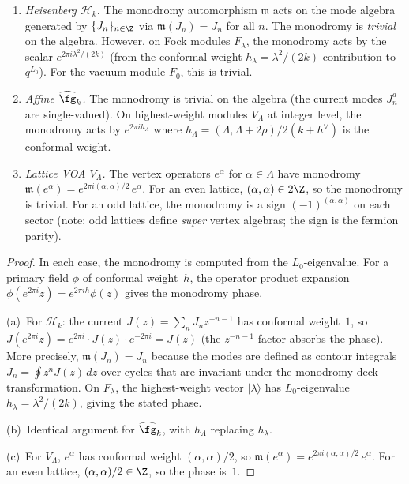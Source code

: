 \begin{proposition}
\label{prop:monodromy-standard}
\begin{enumerate}[label=\textup{(\alph*)}]
\item \emph{Heisenberg $\mathcal{H}_k$.} The monodromy
 automorphism $\mathfrak{m}$ acts on the mode algebra generated
 by $\{J_n\}_{n \in \Z}$ via $\mathfrak{m}(J_n) = J_n$ for all
 $n$. The monodromy is \emph{trivial} on the algebra. However,
 on Fock modules $F_\lambda$, the monodromy acts by the scalar
 $e^{2\pi i \lambda^2 / (2k)}$
 \textup{(}from the conformal weight $h_\lambda = \lambda^2/(2k)$
 contribution to $q^{L_0}$\textup{)}. For the vacuum module
 $F_0$, this is trivial.
\item \emph{Affine $\widehat{\fg}_k$.} The monodromy is trivial on
 the algebra \textup{(}the current modes $J^a_n$ are
 single-valued\textup{)}. On highest-weight modules $V_\Lambda$ at
 integer level, the monodromy acts by
 $e^{2\pi i h_\Lambda}$ where $h_\Lambda = (\Lambda, \Lambda +
 2\rho) / 2(k + h^\vee)$ is the conformal weight.
\item \emph{Lattice VOA $V_\Lambda$.} The vertex operators
 $e^\alpha$ for $\alpha \in \Lambda$ have monodromy
 $\mathfrak{m}(e^\alpha) = e^{2\pi i (\alpha, \alpha)/2}\, e^\alpha$.
 For an even lattice, $(\alpha, \alpha) \in 2\Z$, so the monodromy
 is trivial. For an odd lattice, the monodromy is a sign
 $(-1)^{(\alpha,\alpha)}$ on each sector (note: odd lattices
 define \emph{super} vertex algebras; the sign is the
 fermion parity).
\end{enumerate}
\end{proposition}

\begin{proof}
In each case, the monodromy is computed from the $L_0$-eigenvalue.
For a primary field $\phi$ of conformal weight~$h$, the operator
product expansion $\phi(e^{2\pi i} z) = e^{2\pi i h} \phi(z)$ gives
the monodromy phase.

(a)~For $\mathcal{H}_k$: the current $J(z) = \sum_n J_n z^{-n-1}$
has conformal weight~$1$, so $J(e^{2\pi i}z) = e^{2\pi i} \cdot
J(z) \cdot e^{-2\pi i} = J(z)$ (the $z^{-n-1}$ factor absorbs the
phase). More precisely, $\mathfrak{m}(J_n) = J_n$ because the modes
are defined as contour integrals $J_n = \oint z^n J(z)\,dz$ over
cycles that are invariant under the monodromy deck transformation.
On $F_\lambda$, the highest-weight vector $|\lambda\rangle$ has
$L_0$-eigenvalue $h_\lambda = \lambda^2/(2k)$, giving the stated
phase.

(b)~Identical argument for $\widehat{\fg}_k$, with $h_\Lambda$
replacing $h_\lambda$.

(c)~For $V_\Lambda$, $e^\alpha$ has conformal weight
$(\alpha,\alpha)/2$, so $\mathfrak{m}(e^\alpha) = e^{2\pi i
(\alpha,\alpha)/2}\, e^\alpha$. For an even lattice,
$(\alpha,\alpha)/2 \in \Z$, so the phase is~$1$.
\end{proof}

